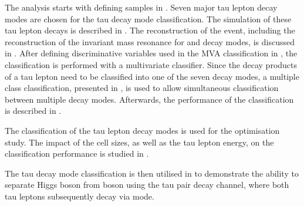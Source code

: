 The analysis starts with defining samples in . Seven major tau lepton decay modes are chosen for the tau decay mode classification. The simulation of these tau lepton decays is described in .  The reconstruction of the event, including the reconstruction of the invariant mass resonance for \decayRho and \decayAi decay modes, is discussed in .  After defining discriminative variables used in the MVA classification in , the classification is performed with a multivariate classifier. Since the decay products of a tau lepton need to be classified into one of the seven decay modes, a multiple class classification, presented in , is used to allow simultaneous classification between  multiple decay modes. Afterwards, the performance of the classification is described in .


The classification of the tau lepton decay modes is used for the \ECAL optimisation study. The impact of  the \ECAL cell sizes,  as well as the tau lepton energy,  on the classification performance is studied in .

The tau decay mode classification is then utilised in  to demonstrate the ability to separate Higgs boson from \PZ  boson using the tau pair decay channel, where both tau leptons subsequently decay   via  \tauToPion mode.



